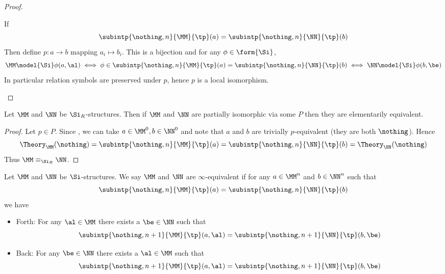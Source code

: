 \begin{proof}
    \begin{backward}
        If
        \[
            \subintp{\nothing,n}{\MM}{\tp}(a) = 
            \subintp{\nothing,n}{\NN}{\tp}(b)
        \]
        Then define $p : a \to b$ mapping $a_i \mapsto b_i$.
        This is a bijection and for any $\phi \in \form{\Si}$,
        \[\MM \model{\Si} \phi(a,\al) \iff 
        \phi \in \subintp{\nothing,n}{\MM}{\tp}(a) = 
        \subintp{\nothing,n}{\NN}{\tp}(b)
        \iff \NN \model{\Si} \phi(b,\be)\]
        In particular relation symbols are preserved under $p$,
        hence $p$ is a local isomorphism.
    \end{backward}
\end{proof}%

\begin{prop}
    Let $\MM$ and $\NN$ be $\Si_R$-structures.
    Then if $\MM$ and $\NN$ are partially isomorphic via some $P$
    then they are elementarily equivalent.
\end{prop}
\begin{proof}
    Let $p \in P$.
    Since ,
    we can take $a \in \MM^0,b \in \NN^0$ and
    note that $a$ and $b$ are trivially $p$-equivalent 
    (they are both $\nothing$).
    Hence 
    \[\Theory_\MM(\nothing) = \subintp{\nothing,n}{\MM}{\tp}(a) = 
    \subintp{\nothing,n}{\NN}{\tp}(b) = \Theory_\NN(\nothing)\]
    Thus $\MM \equiv_{\Si_R} \NN$.
\end{proof}

\begin{dfn}
    Let $\MM$ and $\NN$ be $\Si$-structures.
    We say $\MM$ and $\NN$ are $\infty$-equivalent if 
    for any $a \in \MM^n$ and $b \in \NN^n$ such that 
    \[\subintp{\nothing,n}{\MM}{\tp}(a) = 
    \subintp{\nothing,n}{\NN}{\tp}(b)\]
    we have 
    \begin{itemize}
        \item Forth: 
        For any $\al \in \MM$ there exists a $\be \in \NN$ such that 
        \[\subintp{\nothing,n+1}{\MM}{\tp}(a,\al) = 
        \subintp{\nothing,n+1}{\NN}{\tp}(b,\be)\]
        \item Back:
        For any $\be \in \NN$ there exists a $\al \in \MM$ such that 
        \[\subintp{\nothing,n+1}{\MM}{\tp}(a,\al) = 
        \subintp{\nothing,n+1}{\NN}{\tp}(b,\be)\]
    \end{itemize}
\end{dfn}

